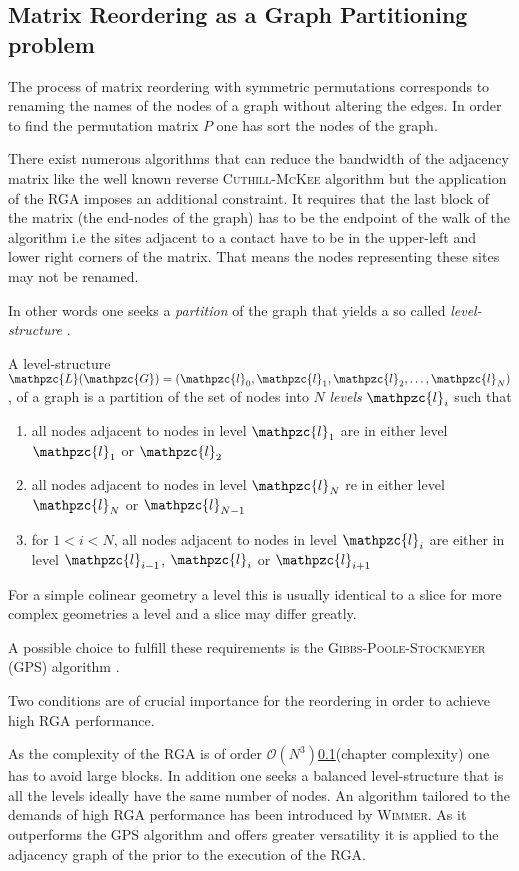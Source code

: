 \subsection{Matrix Reordering as a Graph Partitioning problem}
The process of matrix reordering with symmetric permutations corresponds to renaming the names of the nodes of a graph without altering the edges. In order to find the permutation matrix $P$ one has sort the nodes of the graph.\par
There exist numerous algorithms that can reduce the bandwidth of the adjacency matrix like the well known reverse \textsc{Cuthill-McKee} algorithm but the application of the RGA imposes an additional constraint. It requires that the last block of the matrix (the end-nodes of the graph) has to be the endpoint of the walk of the algorithm i.e the sites adjacent to a contact have to be in the upper-left and lower right corners of the matrix. That means the nodes representing these sites may not be renamed.\par
In other words one seeks a \emph{partition} of the graph that yields a so called \emph{level-structure} \cite{gibbs.Siam.13.236}.
\begin{dfn}
A level-structure $\mathpzc{L}(\mathpzc{G}) = (\mathpzc{l}_0,\mathpzc{l}_1,\mathpzc{l}_2,\dotsc,\mathpzc{l}_N)$, of a graph  is a partition of the set of nodes  into $N$ \emph{levels} $\mathpzc{l}_i$ such that
\begin{enumerate}
\item all nodes adjacent to nodes in level $\mathpzc{l}_1$ are in either level $\mathpzc{l}_1$ or $\mathpzc{l}_2$
\item all nodes adjacent to nodes in level $\mathpzc{l}_N$ re in either level $\mathpzc{l}_{N}$ or $\mathpzc{l}_{N-1}$
\item for $1 < i < N$, all nodes adjacent to nodes in level $\mathpzc{l}_{i}$ are either in level $\mathpzc{l}_{i-1}$, $\mathpzc{l}_{i}$ or $\mathpzc{l}_{i+1}$
\end{enumerate}
\end{dfn}
For a simple colinear geometry a level this is usually identical to a slice for more complex geometries a level and a slice may differ greatly.\par
A possible choice to fulfill these requirements is the \textsc{Gibbs-Poole-Stockmeyer} (GPS) algorithm \cite{gibbs.Siam.13.236}.\par
Two conditions are of crucial importance for the reordering in order to achieve high RGA performance.\par
As the complexity of the RGA is of order $\mathcal{O}(N^3)$\ref{}(chapter complexity) one has to avoid large blocks. In addition one seeks a balanced level-structure that is all the levels ideally have the same number of nodes.
An algorithm tailored to the demands of high RGA performance has been introduced by \textsc{Wimmer}. As it outperforms the GPS algorithm and offers greater versatility \cite{Wimmer2009JComPhys} it is applied to the adjacency graph of the \hamil{} prior to the execution of the RGA.
